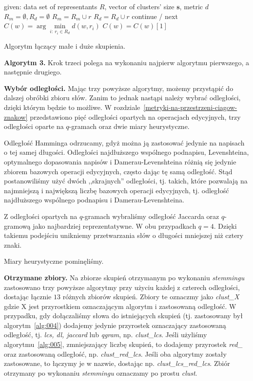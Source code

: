 \documentclass{praca1}
\begin{document}
\begin{algorithm}[h!]
\begin{algorithmic}[1]
		\State given: data set of representants $R$, vector of clusters' size $\mathbf{s}$, metric $d$
		\State $R_m = \emptyset, R_d = \emptyset$
				\State $R_m = R_m \cup r$
			\Else
				\State $R_d = R_d \cup r$
			\EndIf
		\EndFor
        		\State continue / next
        	\EndIf
            \State $C(w) = \arg\min\limits_{i:\ r_i \in R_d} d(w,r_i)$
            	\State $C(w) = C(w)[1]$
            \EndIf
       \EndFor
\end{algorithmic}
\caption{Algorytm łączący małe i duże skupienia.}\label{alg:005}
\end{algorithm}

\textbf{Algorytm 3.} Krok trzeci polega na wykonaniu najpierw algorytmu pierwszego, a następnie drugiego.

\textbf{Wybór odległości.} Mając trzy powyższe algorytmy, możemy przystąpić do dalszej obróbki zbioru słów. Zanim to jednak nastąpi należy wybrać odległości, dzięki którym będzie to możliwe. W rozdziale~\ref{metryki-na-przestrzeni-ciagow-znakow} przedstawiono pięć odległości opartych na operacjach edycyjnych, trzy odległości oparte na $q$-gramach oraz dwie miary heurystyczne. 

Odległość Hamminga odrzucamy, gdyż można ją zastosować jedynie na napisach o tej samej długości. Odległości najdłuższego wspólnego podnapisu, Levenshteina, optymalnego dopasowania napisów i Damerau-Levenshteina różnią się jedynie zbiorem bazowych operacji edycyjnych, często dając tę samą odległość. Stąd postanowiliśmy użyć dwóch ,,skrajnych'' odległości, tj. takich, które pozwalają na najmniejszą i największą liczbę bazowych operacji edycyjnych, tj. odległość najdłuższego wspólnego podnapisu i Damerau-Levenshteina. 

Z odległości opartych na $q$-gramach wybraliśmy odległość Jaccarda oraz $q$-gramową jako najbardziej reprezentatywne. W obu przypadkach $q=4$. Dzięki takiemu podejściu unikniemy przetwarzania słów o długości mniejszej niż cztery znaki.

Miary heurystyczne pominęliśmy.

\textbf{Otrzymane zbiory.} Na zbiorze skupień otrzymanym po wykonaniu \emph{stemmingu} zastosowano trzy powyższe algorytmy przy użyciu każdej z czterech odległości, dostając łącznie $13$ różnych zbiorów skupień. Zbiory te oznaczmy jako \emph{clust\_X} gdzie X jest przyrostkiem oznaczającym algorytm i zastosowaną odległość. W przypadku, gdy dołączaliśmy słowa do istniejących skupień (tj. zastosowany był algorytm~\ref{alg:004}) dodajemy jedynie przyrostek oznaczający zastosowaną odległość, tj. \emph{lcs, dl, jaccard} lub \emph{qgram}, np. \emph{clust\_lcs}. Jeśli użyliśmy algorytmu~\ref{alg:005}, zmniejszający liczbę skupień, to dodajemy przyrostek \emph{red\_} oraz zastosowaną odległość, np. \emph{clust\_red\_lcs}. Jeśli oba algorytmy zostały zastosowane, to łączymy je w nazwie, dostając np. \emph{clust\_lcs\_red\_lcs}. Zbiór otrzymany po wykonaniu \emph{stemmingu} oznaczamy po prostu \emph{clust}. 
\end{document}

